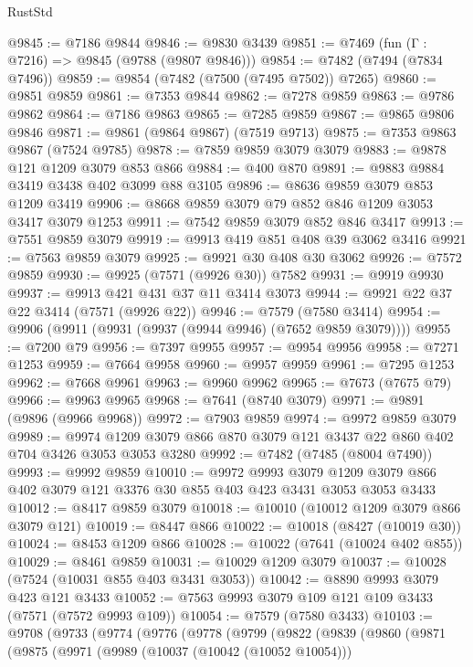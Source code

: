 \begin{lexlean}{RustStd}
\begin{coremodule}
@9845 := @7186 @9844
@9846 := @9830 @3439
@9851 := @7469 (fun (Γ : @7216) => @9845 (@9788 (@9807 @9846)))
@9854 := @7482 (@7494 (@7834 @7496))
@9859 := @9854 (@7482 (@7500 (@7495 @7502)) @7265)
@9860 := @9851 @9859
@9861 := @7353 @9844
@9862 := @7278 @9859
@9863 := @9786 @9862
@9864 := @7186 @9863
@9865 := @7285 @9859
@9867 := @9865 @9806 @9846
@9871 := @9861 (@9864 @9867) (@7519 @9713)
@9875 := @7353 @9863 @9867 (@7524 @9785)
@9878 := @7859 @9859 @3079 @3079
@9883 := @9878 @121 @1209 @3079 @853 @866
@9884 := @400 @870
@9891 := @9883 @9884 @3419 @3438 @402 @3099 @88 @3105
@9896 := @8636 @9859 @3079 @853 @1209 @3419
@9906 := @8668 @9859 @3079 @79 @852 @846 @1209 @3053 @3417 @3079 @1253
@9911 := @7542 @9859 @3079 @852 @846 @3417
@9913 := @7551 @9859 @3079
@9919 := @9913 @419 @851 @408 @39 @3062 @3416
@9921 := @7563 @9859 @3079
@9925 := @9921 @30 @408 @30 @3062
@9926 := @7572 @9859
@9930 := @9925 (@7571 (@9926 @30)) @7582
@9931 := @9919 @9930
@9937 := @9913 @421 @431 @37 @11 @3414 @3073
@9944 := @9921 @22 @37 @22 @3414 (@7571 (@9926 @22))
@9946 := @7579 (@7580 @3414)
@9954 := @9906 (@9911 (@9931 (@9937 (@9944 @9946) (@7652 @9859 @3079))))
@9955 := @7200 @79
@9956 := @7397 @9955
@9957 := @9954 @9956
@9958 := @7271 @1253
@9959 := @7664 @9958
@9960 := @9957 @9959
@9961 := @7295 @1253
@9962 := @7668 @9961
@9963 := @9960 @9962
@9965 := @7673 (@7675 @79)
@9966 := @9963 @9965
@9968 := @7641 (@8740 @3079)
@9971 := @9891 (@9896 (@9966 @9968))
@9972 := @7903 @9859
@9974 := @9972 @9859 @3079
@9989 := @9974 @1209 @3079 @866 @870 @3079 @121 @3437 @22 @860 @402 @704 @3426 @3053 @3053 @3280
@9992 := @7482 (@7485 (@8004 @7490))
@9993 := @9992 @9859
@10010 := @9972
    @9993
    @3079
    @1209
    @3079
    @866
    @402
    @3079
    @121
    @3376
    @30
    @855
    @403
    @423
    @3431
    @3053
    @3053
    @3433
@10012 := @8417 @9859 @3079
@10018 := @10010 (@10012 @1209 @3079 @866 @3079 @121)
@10019 := @8447 @866
@10022 := @10018 (@8427 (@10019 @30))
@10024 := @8453 @1209 @866
@10028 := @10022 (@7641 (@10024 @402 @855))
@10029 := @8461 @9859
@10031 := @10029 @1209 @3079
@10037 := @10028 (@7524 (@10031 @855 @403 @3431 @3053))
@10042 := @8890 @9993 @3079 @423 @121 @3433
@10052 := @7563 @9993 @3079 @109 @121 @109 @3433 (@7571 (@7572 @9993 @109))
@10054 := @7579 (@7580 @3433)
@10103 := @9708
    (@9733
      (@9774
        (@9776
          (@9778
            (@9799
              (@9822
                (@9839
                  (@9860
                    (@9871
                      (@9875
                        (@9971
                          (@9989
                            (@10037 (@10042 (@10052 @10054)))

\end{coremodule}
\end{lexlean}
